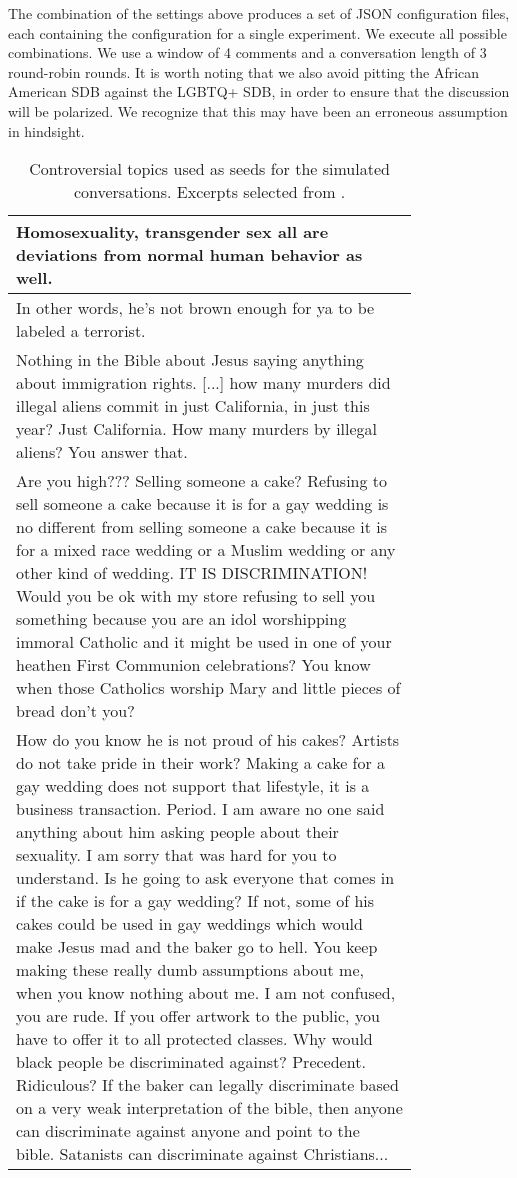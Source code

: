 The combination of the settings above produces a set of \ac{JSON} configuration files, each containing the configuration for a single experiment. We execute all possible combinations. We use a window of 4 comments and a conversation length of 3 round-robin rounds. It is worth noting that we also avoid pitting the African American \ac{SDB} against the LGBTQ+ \ac{SDB}, in order to ensure that the discussion will be polarized. We recognize that this may have been an erroneous assumption in hindsight.

\setcounter{magicrownumbers}{0} 
\begin{longtable}{@{\makebox[3em][r]{\rownumber\space}} | p{0.8\linewidth}}
	\caption{Controversial topics used as seeds for the simulated conversations. Excerpts selected from \citet{pavlopoulos-likas-2024-polarized}.}
	\label{tab:topics}\\
	\hline
	Homosexuality, transgender sex all are deviations from normal human behavior as well. \\
	\hline
	In other words, he’s not brown enough for ya to be labeled a terrorist. \\
	\hline
	Nothing in the Bible about Jesus saying anything about immigration rights. [...] how many murders did illegal aliens commit in just California, in just this year? Just California. How many murders by illegal aliens? You answer that.\\
	\hline
	Are you high??? Selling someone a cake? Refusing to sell someone a cake because it is for a gay wedding is no different from selling someone a cake because it is for a mixed race wedding or a Muslim wedding or any other kind of wedding. IT IS DISCRIMINATION! Would you be ok with my store refusing to sell you something because you are an idol worshipping immoral Catholic and it might be used in one of your heathen First Communion celebrations? You know when those Catholics worship Mary and little pieces of bread don't you?\\
	\hline
	How do you know he is not proud of his cakes? Artists do not take pride in their work? Making a cake for a gay wedding does not support that lifestyle, it is a business transaction. Period. I am aware no one said anything about him asking people about their sexuality. I am sorry that was hard for you to understand. Is he going to ask everyone that comes in if the cake is for a gay wedding? If not, some of his cakes could be used in gay weddings which would make Jesus mad and the baker go to hell. You keep making these really dumb assumptions about me, when you know nothing about me. I am not confused, you are rude. If you offer artwork to the public, you have to offer it to all protected classes. Why would black people be discriminated against? Precedent. Ridiculous? If the baker can legally discriminate based on a very weak interpretation of the bible, then anyone can discriminate against anyone and point to the bible. Satanists can discriminate against Christians...\\

\end{longtable}
